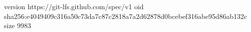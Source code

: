 version https://git-lfs.github.com/spec/v1
oid sha256:e4049409c316a50c73da7c87c2818a7a2d62878d0bcebef316abe95d86ab132c
size 9983
